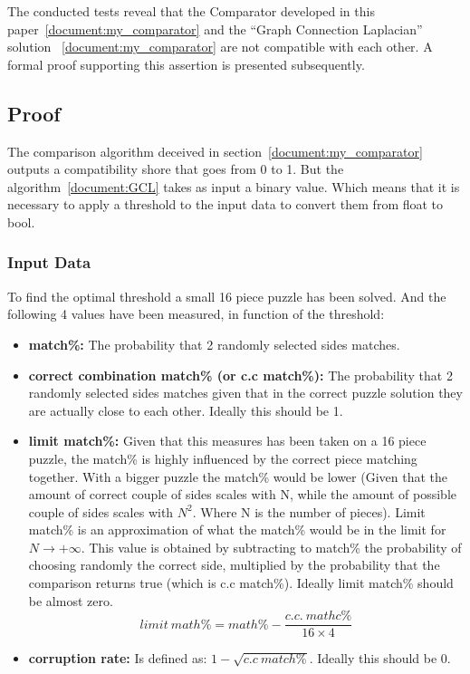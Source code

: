 \documentclass{article}
\begin{document}
The conducted tests reveal that the Comparator developed in this paper~\ref{document:my_comparator}
and the ``Graph Connection Laplacian'' solution ~\ref{document:my_comparator} are not compatible with each other.
A formal proof supporting this assertion is presented subsequently.

\subsection{Proof}

The comparison algorithm deceived in section~\ref{document:my_comparator} outputs a compatibility
shore that goes from 0 to 1.\newline
But the algorithm~\ref{document:GCL} takes as input a binary value.
Which means that it is necessary to apply a threshold to the input
data to convert them from float to bool.
\subsubsection{Input Data}
To find the optimal threshold a small 16 piece puzzle has been solved.
And the following 4 values have been measured, in function of the threshold:

\begin{itemize}
  \item \textbf{match\%:}\newline
  The probability that 2 randomly selected sides matches.
  
  \item \textbf{correct combination match\% (or c.c match\%):}\newline
  The probability that 2 randomly selected sides matches given that in the correct puzzle
  solution they are actually close to each other. Ideally this should be 1.
  
  \item \textbf{limit match\%:}\newline
  Given that this measures has been taken on a 16 piece puzzle,
  the match\% is highly influenced by the correct piece matching together.
  With a bigger puzzle the match\% would be lower (Given that the amount
  of correct couple of sides scales with N, while the amount of
  possible couple of sides scales with \(N^2\). Where N is the number of pieces).\newline
  Limit match\% is an approximation of what the match\%
  would be in the limit for \(N \rightarrow + \infty\).
  This value is obtained by subtracting to match\%
  the probability of choosing randomly the correct side,
  multiplied by the probability that the comparison returns true
  (which is c.c match\%). \newline
  Ideally limit match\% should be almost zero.
  \[limit \: math\% = math\% - \frac{c.c. \: mathc\%}{16 \times 4}\]
  
  \item \textbf{corruption rate:}\newline
  Is defined as: \(1-\sqrt{c.c \: match\%}\). Ideally this should be 0.

\end{itemize}
\end{document}
